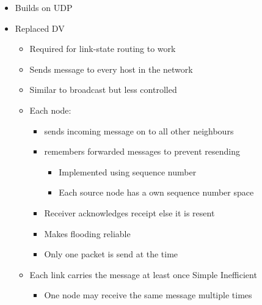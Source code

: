 \begin{itemize}
\begin{itemize}
\begin{itemize}
                    \item Builds on UDP
                \end{itemize}
        \end{itemize}
    \begin{itemize}
        \item Replaced DV
            \begin{itemize}
                \item Required for link-state routing to work
                \item Sends message to every host in the network
                \item Similar to broadcast but less controlled
                \item Each node:
                    \begin{itemize}
                        \item sends incoming message on to all other neighbours
                        \item remembers forwarded messages to prevent resending
                            \begin{itemize}
                                \item Implemented using sequence number
                                \item Each source node has a own sequence number space
                            \end{itemize}
                    \end{itemize}
                    \begin{itemize}
                        \item Receiver acknowledges receipt else it is resent
                        \item Makes flooding reliable
                        \item Only one packet is send at the time
                    \end{itemize}
                \item Each link carries the message at least once
                \ipro Simple
                \icon Inefficient
                    \begin{itemize}
                        \item One node may receive the same message multiple times
                    \end{itemize}
            \end{itemize}

\end{itemize}
\end{itemize}
